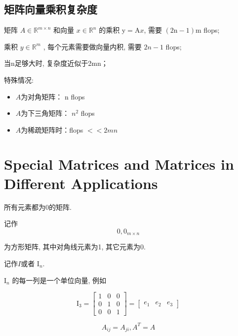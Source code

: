 \subsection{矩阵向量乘积复杂度}

矩阵 $ A \in \mathbb{R}^{m \times n} $ 和向量 $ x \in \mathbb{R}^{n} $ 的乘积 $ \mathrm{y}=\mathrm{A} x $, 需要 $ (2 \mathrm{n}-1) \mathrm{m} $ flops;

乘积 $ y \in \mathbb{R}^{m} $ , 每个元素需要做向量内积, 需要 $ 2 n-1 $ flops;

当n足够大时, 复杂度近似于2mn；

特殊情况:

\begin{itemize}
    \item $A$为对角矩阵： $ \mathrm{n} $ flops
    \item $A$为下三角矩阵： $ n^{2} $ flops
    \item $A$为稀疏矩阵时：flops $ <<2 m n $
\end{itemize}


\section{Special Matrices and Matrices in Different Applications}

\begin{definition}
    所有元素都为0的矩阵.

    记作$$0, 0_{m \times n} $$
\end{definition}

\begin{definition}[单位矩阵]
    为方形矩阵, 其中对角线元素为1, 其它元素为0.

    记作$I$或者 $ \mathrm{I}_{n} $.
\end{definition}

\begin{corollary}
  $ \mathrm{I}_{n} $ 的每一列是一个单位向量, 例如

$$
\mathrm{I}_{3}=\left[\begin{array}{lll}
1 & 0 & 0 \\
0 & 1 & 0 \\
0 & 0 & 1
\end{array}\right]=\left[\begin{array}{lll}
e_{1} & e_{2} & e_{3}
\end{array}\right]
$$
\end{corollary}

\begin{definition}
    $$ A_{i j}=A_{j i}, A^T =A $$
\end{definition}

